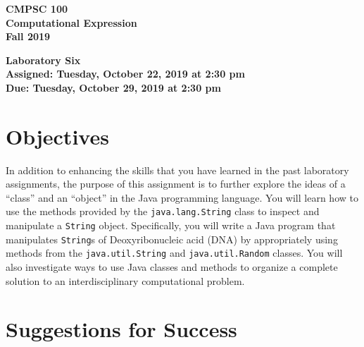 \documentclass[11pt]{article}
\newcommand{\assignmentduedate}{October 29}
\newcommand{\assignmentassignedate}{October 22}
\newcommand{\assignmentnumber}{Six}
\newcommand{\labyear}{2019}
\newcommand{\labday}{Tuesday}
\newcommand{\labtime}{2:30 pm}
\newcommand{\assigneddate}{Assigned: \labday, \assignmentassignedate, \labyear{} at \labtime{}}
\newcommand{\duedate}{Due: \labday, \assignmentduedate, \labyear{} at \labtime{}}
\newcommand{\labtitle}[1]
{
  \begin{center}
    \begin{center}
      \bf
      CMPSC 100\\Computational Expression\\
      Fall 2019\\
      \medskip
    \end{center}
    \bf
    #1
  \end{center}
}
\begin{document}
\thispagestyle{empty}

\labtitle{Laboratory \assignmentnumber{} \\ \assigneddate{} \\ \duedate{}}

\section*{Objectives}

In addition to enhancing the skills that you have learned in the past laboratory
assignments, the purpose of this assignment is to further explore the ideas of a
``class'' and an ``object'' in the Java programming language. You will learn how
to use the methods provided by the {\tt java.lang.String} class to inspect and
manipulate a {\tt String} object. Specifically, you will write a Java program
that manipulates {\tt String}s of Deoxyribonucleic acid (DNA) by appropriately
using methods from the {\tt java.util.String} and {\tt java.util.Random}
classes. You will also investigate ways to use Java classes and methods to
organize a complete solution to an interdisciplinary computational problem.

\section*{Suggestions for Success}
\end{document}
